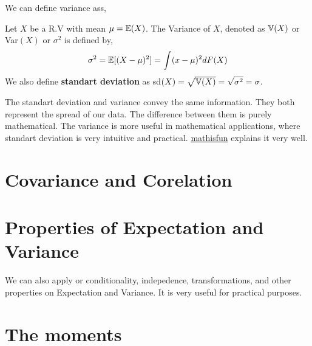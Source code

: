 We can define variance ass,
\begin{definition}
    Let $X$ be a R.V with mean $\mu = {\mathbb{E}}(X)$. The Variance of $X$, denoted as ${\mathbb{V}}(X)$ or  Var$(X)$ or $\sigma ^2$ is defined by,
    \[ \sigma^2 = {\mathbb{E}} [(X- \mu)^2] = \int (x -\mu)^2 dF(X)\]
    We also define \textbf{standart deviation} as sd$(X) = \sqrt{{\mathbb{V}} (X)}= \sqrt{\sigma^2}= \sigma$.
\end{definition}
The standart deviation and variance convey the same information. They both represent the spread of our data. 
The difference between them is purely mathematical. The variance is more useful in mathematical applications, where standart deviation is very intuitive and practical. 
\href{https://www.mathsisfun.com/data/standard-deviation.html}{mathisfun} explains it very well.

\section{Covariance and Corelation}
\section{Properties of Expectation and Variance}
We can also apply or conditionality, indepedence, transformations, and other properties on Expectation and Variance. It is very useful for practical purposes.
\section{The moments}